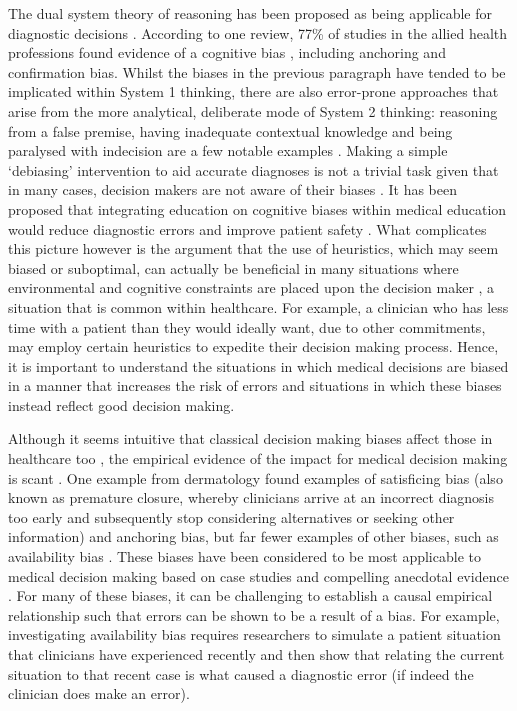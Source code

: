 \documentclass[a4paper, nobind]{templates/ociamthesis}
\begin{document}
\hfill\break
The dual system theory of reasoning has been proposed as being applicable for diagnostic decisions \autocite{croskerry_clinical_2009}. According to one review, 77\% of studies in the allied health professions found evidence of a cognitive bias \autocite{featherston_decision_2020}, including anchoring and confirmation bias. Whilst the biases in the previous paragraph have tended to be implicated within System 1 thinking, there are also error-prone approaches that arise from the more analytical, deliberate mode of System 2 thinking: reasoning from a false premise, having inadequate contextual knowledge and being paralysed with indecision are a few notable examples \autocite{croskerry_deciding_2014}. Making a simple `debiasing' intervention to aid accurate diagnoses is not a trivial task given that in many cases, decision makers are not aware of their biases \autocite{croskerry_mindless_2013}. It has been proposed that integrating education on cognitive biases within medical education would reduce diagnostic errors and improve patient safety \autocite{royce_teaching_2019}. What complicates this picture however is the argument that the use of heuristics, which may seem biased or suboptimal, can actually be beneficial in many situations where environmental and cognitive constraints are placed upon the decision maker \autocite{gigerenzer_why_2008}, a situation that is common within healthcare. For example, a clinician who has less time with a patient than they would ideally want, due to other commitments, may employ certain heuristics to expedite their decision making process. Hence, it is important to understand the situations in which medical decisions are biased in a manner that increases the risk of errors and situations in which these biases instead reflect good decision making.

\hfill\break
Although it seems intuitive that classical decision making biases affect those in healthcare too \autocite{restrepo_annals_2020}, the empirical evidence of the impact for medical decision making is scant \autocite{van_den_berge_cognitive_2013}. One example from dermatology found examples of satisficing bias (also known as premature closure, whereby clinicians arrive at an incorrect diagnosis too early and subsequently stop considering alternatives or seeking other information) and anchoring bias, but far fewer examples of other biases, such as availability bias \autocite{crowley_automated_2013}. These biases have been considered to be most applicable to medical decision making based on case studies and compelling anecdotal evidence \autocite{groopman_how_2010}. For many of these biases, it can be challenging to establish a causal empirical relationship such that errors can be shown to be a result of a bias. For example, investigating availability bias requires researchers to simulate a patient situation that clinicians have experienced recently and then show that relating the current situation to that recent case is what caused a diagnostic error (if indeed the clinician does make an error).
\end{document}
